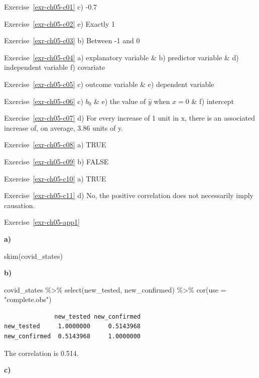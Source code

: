 \documentclass[
  letterpaper,
  DIV=11,
  numbers=noendperiod]{scrreprt}
\newenvironment{Shaded}{\begin{snugshade}}{\end{snugshade}}
\newcommand{\AttributeTok}[1]{\textcolor[rgb]{0.40,0.45,0.13}{#1}}
\newcommand{\FunctionTok}[1]{\textcolor[rgb]{0.28,0.35,0.67}{#1}}
\newcommand{\NormalTok}[1]{\textcolor[rgb]{0.00,0.23,0.31}{#1}}
\newcommand{\SpecialCharTok}[1]{\textcolor[rgb]{0.37,0.37,0.37}{#1}}
\newcommand{\StringTok}[1]{\textcolor[rgb]{0.13,0.47,0.30}{#1}}
\theoremstyle{definition}
\theoremstyle{remark}
\begin{document}
Exercise~\ref{exr-ch05-c01} c) -0.7

Exercise~\ref{exr-ch05-c02} e) Exactly 1

Exercise~\ref{exr-ch05-c03} b) Between -1 and 0

Exercise~\ref{exr-ch05-c04} a) explanatory variable \& b) predictor
variable \& d) independent variable f) covariate

Exercise~\ref{exr-ch05-c05} c) outcome variable \& e) dependent variable

Exercise~\ref{exr-ch05-c06} c) \(b_0\) \& e) the value of \(\hat{y}\)
when \(x=0\) \& f) intercept

Exercise~\ref{exr-ch05-c07} d) For every increase of 1 unit in x, there
is an associated increase of, on average, 3.86 units of y.

Exercise~\ref{exr-ch05-c08} a) TRUE

Exercise~\ref{exr-ch05-c09} b) FALSE

Exercise~\ref{exr-ch05-c10} a) TRUE

Exercise~\ref{exr-ch05-c11} d) No, the positive correlation does not
necessarily imply causation.

Exercise~\ref{exr-ch05-app1}

\textbf{a)}

\begin{Shaded}
\begin{Highlighting}[]
\FunctionTok{skim}\NormalTok{(covid\_states)}
\end{Highlighting}
\end{Shaded}

\textbf{b)}

\begin{Shaded}
\begin{Highlighting}[]
\NormalTok{covid\_states }\SpecialCharTok{\%\textgreater{}\%} 
  \FunctionTok{select}\NormalTok{(new\_tested, new\_confirmed) }\SpecialCharTok{\%\textgreater{}\%} 
  \FunctionTok{cor}\NormalTok{(}\AttributeTok{use =} \StringTok{"complete.obs"}\NormalTok{)}
\end{Highlighting}
\end{Shaded}

\begin{verbatim}
              new_tested new_confirmed
new_tested     1.0000000     0.5143968
new_confirmed  0.5143968     1.0000000
\end{verbatim}

The correlation is 0.514.

\textbf{c)}
\end{document}
